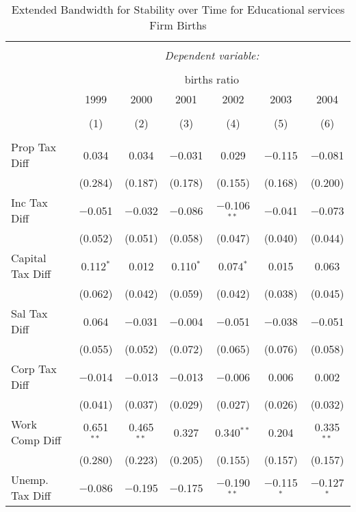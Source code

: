 
\begin{table}[!htbp] \centering 
  \caption{Extended Bandwidth for Stability over Time for  Educational services Firm Births} 
  \label{61 ebyear} 
\small 
\begin{tabular}{@{\extracolsep{5pt}}lcccccc} 
\\[-1.8ex]\hline 
\hline \\[-1.8ex] 
 & \multicolumn{6}{c}{\textit{Dependent variable:}} \\ 
\cline{2-7} 
\\[-1.8ex] & \multicolumn{6}{c}{births ratio} \\ 
 & 1999 & 2000 & 2001 & 2002 & 2003 & 2004 \\ 
\\[-1.8ex] & (1) & (2) & (3) & (4) & (5) & (6)\\ 
\hline \\[-1.8ex] 
 Prop Tax Diff & 0.034 & 0.034 & $-$0.031 & 0.029 & $-$0.115 & $-$0.081 \\ 
  & (0.284) & (0.187) & (0.178) & (0.155) & (0.168) & (0.200) \\ 
  Inc Tax Diff & $-$0.051 & $-$0.032 & $-$0.086 & $-$0.106$^{**}$ & $-$0.041 & $-$0.073 \\ 
  & (0.052) & (0.051) & (0.058) & (0.047) & (0.040) & (0.044) \\ 
  Capital Tax Diff & 0.112$^{*}$ & 0.012 & 0.110$^{*}$ & 0.074$^{*}$ & 0.015 & 0.063 \\ 
  & (0.062) & (0.042) & (0.059) & (0.042) & (0.038) & (0.045) \\ 
  Sal Tax Diff & 0.064 & $-$0.031 & $-$0.004 & $-$0.051 & $-$0.038 & $-$0.051 \\ 
  & (0.055) & (0.052) & (0.072) & (0.065) & (0.076) & (0.058) \\ 
  Corp Tax Diff & $-$0.014 & $-$0.013 & $-$0.013 & $-$0.006 & 0.006 & 0.002 \\ 
  & (0.041) & (0.037) & (0.029) & (0.027) & (0.026) & (0.032) \\ 
  Work Comp Diff & 0.651$^{**}$ & 0.465$^{**}$ & 0.327 & 0.340$^{**}$ & 0.204 & 0.335$^{**}$ \\ 
  & (0.280) & (0.223) & (0.205) & (0.155) & (0.157) & (0.157) \\ 
  Unemp. Tax Diff & $-$0.086 & $-$0.195 & $-$0.175 & $-$0.190$^{**}$ & $-$0.115$^{*}$ & $-$0.127$^{*}$ \\ 

\end{tabular}
\end{table}
